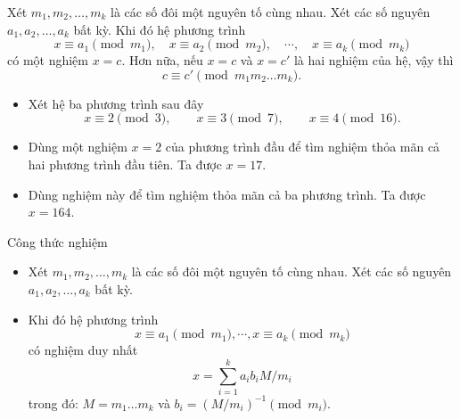\begin{frame}
	\begin{thrm}
		Xét $m_1, m_2, \dots, m_k$ là các số đôi một nguyên tố cùng nhau. Xét các số nguyên $a_1, a_2, \dots, a_k$ bất kỳ. Khi đó hệ phương trình
		\[
		x \equiv a_1\pmod{m_1},\quad x \equiv a_2\pmod{m_2},\quad \cdots,\quad x \equiv a_k\pmod{m_k} 
		\]
		có một nghiệm $x = c$. Hơn nữa, nếu $x=c$ và $x=c'$ là hai nghiệm của hệ, vậy thì 
		$$
			c \equiv c'  \pmod{m_1 m_2 \dots m_k}.
		$$
	\end{thrm}
\end{frame}

\begin{frame}
	\begin{xmpl}
\begin{itemize}
	\item<+-> Xét hệ ba phương trình sau đây 
		\[
			x \equiv 2 \pmod{3},\qquad x\equiv 3 \pmod{7},\qquad x \equiv 4 \pmod{16}. 
		\]
		
		\item<+-> Dùng một nghiệm $x=2$ của phương trình đầu để tìm nghiệm thỏa mãn cả hai phương trình đầu tiên. Ta được $x = 17$.
 
 \item<+-> Dùng nghiệm này để tìm nghiệm thỏa mãn cả ba phương trình. Ta được $x=164$. 
\end{itemize}			
\end{xmpl}
\end{frame}

\begin{frame}{Công thức nghiệm}
	\begin{itemize}
		\item 		Xét $m_1, m_2, \dots, m_k$ là các số đôi một nguyên tố cùng nhau. Xét các số nguyên $a_1, a_2, \dots, a_k$ bất kỳ. 
		\item<+-> Khi đó hệ phương trình
		\[
		x \equiv a_1\pmod{m_1},\cdots, x \equiv a_k\pmod{m_k} 
		\]
		có nghiệm duy nhất
		\[
			x = \sum_{i=1}^k a_i b_i M/m_i
		\]
		trong đó: $M = m_1\dots m_k$ và $b_i = \left(M/m_i\right)^{-1} \pmod{m_i}$.
	\end{itemize}
\end{frame}


